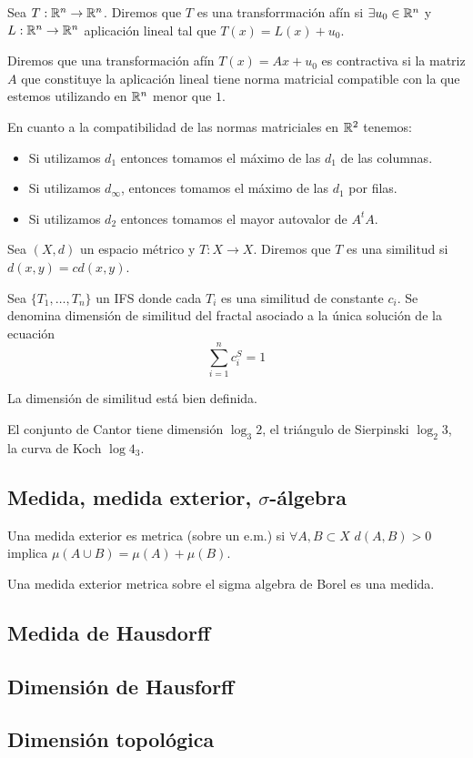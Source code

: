 \documentclass[FyPI.tex]{subfiles}
\begin{document}
\begin{defi}
Sea $T:\mathbb{R}^n\to\mathbb{R}^n$. Diremos que $T$ es una transforrmación afín si $\exists u_0 \in \mathbb{R}^n$ y $L:\mathbb{R}^n\to\mathbb{R}^n$ aplicación lineal tal que $T(x)=L(x)+u_0$.
\end{defi}
\begin{defi}
Diremos que una transformación afín $T(x)=Ax+u_0$ es contractiva si la matriz $A$ que constituye la aplicación lineal tiene norma matricial compatible con la que estemos utilizando en $\mathbb{R}^n$ menor que $1$.
\end{defi}
\begin{nota}
En cuanto a la compatibilidad de las normas matriciales en $\mathbb{R}^2$ tenemos: 
\begin{itemize}
\item Si utilizamos $d_1$ entonces tomamos el máximo de las $d_1$ de las columnas.
\item Si utilizamos $d_\infty$, entonces tomamos el máximo de las $d_1$ por filas.
\item Si utilizamos $d_2$ entonces tomamos el mayor autovalor de $A^tA$.
\end{itemize}
\end{nota}
\begin{defi}
Sea $(X,d)$ un espacio métrico y $T:X\to X$. Diremos que $T$ es una similitud si $d(x,y)=c d(x,y)$.
\end{defi}
\begin{defi}
Sea $\{T_1,\dotsc,T_n\}$ un IFS donde cada $T_i$ es una similitud de constante $c_i$. Se denomina dimensión de similitud del fractal asociado a la única solución de la ecuación
$$
\sum_{i=1}^n c^S_i = 1
$$

\end{defi}
\begin{nota}
La dimensión de similitud está bien definida.
\end{nota}
\begin{example}
El conjunto de Cantor tiene dimensión $\log_3 2$, el triángulo de Sierpinski $\log_2 3$, la curva de Koch $\log 4_3$. 
\end{example}
\subsection{Medida, medida exterior, $\sigma$-álgebra}

Una medida exterior es metrica (sobre un e.m.) si $\forall A,B \subset X$ $d(A,B)>0$ implica $\mu(A\cup B) = \mu(A)+\mu(B)$.

Una medida exterior metrica sobre el sigma algebra de Borel es una medida.
\subsection{Medida de Hausdorff}
\subsection{Dimensión de Hausforff}
\subsection{Dimensión topológica}
\end{document}
